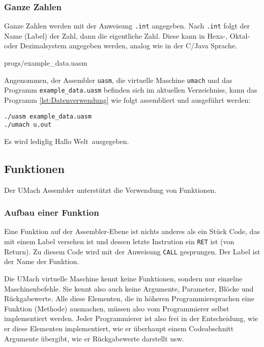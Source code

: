 \subsubsection{Ganze Zahlen}

Ganze Zahlen werden mit der Anweisung \texttt{.int} angegeben. Nach
\texttt{.int} folgt der Name (Label) der Zahl, dann die eigentliche Zahl. Diese
kann in Hexa-, Oktal- oder Dezimalsystem angegeben werden, analog wie in der
C/Java Sprache.


{progs/example_data.uasm}

Angenommen, der Assembler \texttt{uasm}, die virtuelle Maschine
\texttt{umach} und das Programm \texttt{example\_data.uasm} befinden sich im
aktuellen Verzeichniss, kann das Programm \ref{lst:Datenverwendung}  wie folgt
assembliert und ausgeführt werden:
\begin{lstlisting}
./uasm example_data.uasm
./umach u.out
\end{lstlisting}
Es wird lediglig \glqq Hallo Welt\grqq\ ausgegeben.



\subsection{Funktionen}

Der UMach Assembler unterstützt die Verwendung von Funktionen.

\subsubsection{Aufbau einer Funktion}

Eine Funktion auf der Assembler-Ebene ist nichts anderes als ein Stück Code,
das mit einem Label versehen ist und dessen letzte Instrution ein \texttt{RET}
ist (von Return). Zu diesem Code wird mit der Anweisung \texttt{CALL}
gesprungen. Der Label ist der Name der Funktion.

Die UMach virtuelle Maschine kennt keine Funktionen, sondern nur einzelne
Maschinenbefehle. Sie kennt also auch keine Argumente, Parameter, Blöcke und
Rückgabewerte. Alle diese Elementen, die in höheren Programmiersprachen eine
Funktion (Methode) ausmachen, müssen also vom Programmierer selbst implementiert
werden. Jeder Programmierer ist also frei in der Entscheidung, wie er diese
Elementen implementiert, wie er überhaupt einem Codeabschnitt Argumente
übergibt, wie er Rückgabewerte darstellt usw. 

